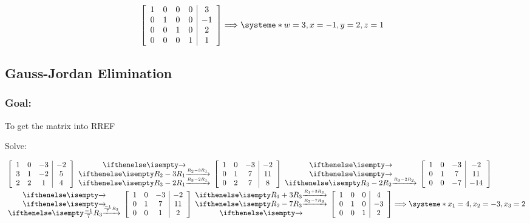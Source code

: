\documentclass[
  letterpaper,
  DIV=11,
  numbers=noendperiod]{scrartcl}
\begin{document}
\begin{align*}
&\left[\begin{array}{cccc|c}1 & 0 & 0 & 0 & 3 \\ 0 & 1 & 0 & 0 & -1 \\ 0 & 0 & 1 & 0 & 2 \\ 0 & 0 & 0 & 1 & 1 \end{array}\right] \Longrightarrow \systeme*{w=3, x=-1, y=2, z=1}
\end{align*}

\newpage{}

\subsection{Gauss-Jordan Elimination}\label{gauss-jordan-elimination}

\subsubsection{Goal:}\label{goal-1}

To get the matrix into RREF

Solve: 

\begin{align*}
&\left[\begin{array}{ccc|c}1 & 0 & -3 & -2 \\ 3 & 1 & -2 & 5 \\ 2 & 2 & 1 & 4\end{array}\right]\rowops{,R_2-3R_1,R_3-2R_1}\left[\begin{array}{ccc|c}1 & 0 & -3 & -2 \\ 0 & 1 & 7 & 11 \\ 0 & 2 & 7 & 8\end{array}\right]\rowops{,,R_3-2R_2}\left[\begin{array}{ccc|c}1 & 0 & -3 & -2 \\ 0 & 1 & 7 & 11 \\ 0 & 0 & -7 & -14\end{array}\right]\\
&\rowops{,,\frac{-1}{7}R_3}\left[\begin{array}{ccc|c}1 & 0 & -3 & -2 \\ 0 & 1 & 7 & 11 \\ 0 & 0 & 1 & 2\end{array}\right]\rowops{R_1+3R_3,R_2-7R_3,}\left[\begin{array}{ccc|c}1 & 0 & 0 & 4 \\ 0 & 1 & 0 & -3 \\ 0 & 0 & 1 & 2\end{array}\right] \Longrightarrow \systeme*{x_1=4, x_2=-3, x_3=2}
\end{align*}
\end{document}
